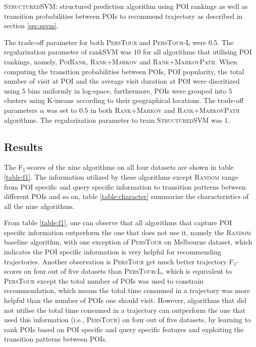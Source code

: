 \textsc{StructuredSVM}: structured prediction algorithm using POI rankings as well as transition probabilities
    between POIs to recommend trajectory as described in section \ref{sec:ssvm}.

The trade-off parameter for both \textsc{PersTour} and \textsc{PersTour-L} were $0.5$.
The regularization parameter of rankSVM was $10$ for all algorithms that utilising POI rankings, namely,
\textsc{PoiRank}, \textsc{Rank+Markov} and \textsc{Rank+MarkovPath}.
When computing the transition probabilities between POIs,
POI popularity, the total number of visit at POI and the average visit duration at POI were discritized using
$5$ bins uniformly in log-space, furthermore, POIs were grouped into $5$ clusters using K-means according to
their geographical locations.
The trade-off parameters $\alpha$ was set to $0.5$ in both \textsc{Rank+Markov} and \textsc{Rank+MarkovPath} algorithms.
The regularization parameter to train \textsc{StructuredSVM} was $1$.


\subsection{Results}
The F$_1$-scores of the nine algorithms on all four datasets are shown in table \ref{table:f1}.
The information utilized by these algorithms except \textsc{Random} range from POI specific and query specific
information to transition patterns between different POIs and so on, table \ref{table:character} summarize the
characteristics of all the nine algorithms.

From table \ref{table:f1}, one can observe that all algorithms that capture POI specific information
outperform the one that does not use it, namely the \textsc{Random} baseline algorithm,
with one exception of \textsc{PersTour} on Melbourne dataset,
which indicates the POI specific information is very helpful for recommending trajectories.
%
Another observation is \textsc{PersTour} get much better trajectory F$_1$-scores on four out of five datasets
than \textsc{PersTour-L}, which is equivalent to \textsc{PersTour} except the total number of POIs was used to
constrain recommendation, which means the total time consumed in a trajectory was more helpful than the number
of POIs one should visit.
%
However, algorithms that did not utilise the total time consumed in a trajectory can outperform the one that
used this information (i.e., \textsc{PersTour}) on four out of five datasets,
by learning to rank POIs based on POI specific and query specific features and exploiting the transition patterns
between POIs.

